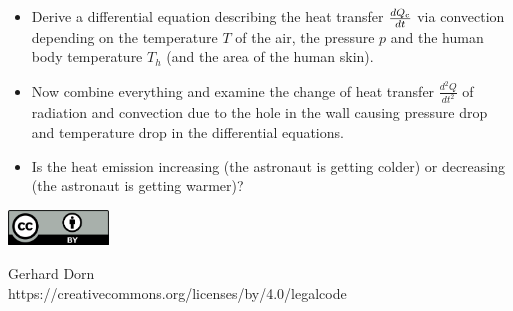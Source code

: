 \documentclass[12pt,a4paper]{article} %
\begin{document}
\begin{itemize}
\item Derive a differential equation describing the heat transfer $\frac{dQ_\textnormal{c}}{dt}$ via convection depending on the temperature $T$ of the air, the pressure $p$ and the human body temperature $T_h$ (and the area of the human skin).
 \item Now combine everything and examine the change of heat transfer $\frac{d^2 Q}{dt^2}$ of radiation and convection due to the hole in the wall causing pressure drop and temperature drop in the differential equations. 
\item Is the heat emission increasing (the astronaut is getting colder) or decreasing (the astronaut is getting warmer)?
\end{itemize}







\vspace{2cm}
\begin{minipage}[t]{1\textwidth}
	\raggedleft
	\centering
	\includegraphics[width = 0.20\textwidth]{CC-BY_icon}
	\vspace{0.2cm}
	
	\centering
	{\Large Gerhard Dorn} \\
	https://creativecommons.org/licenses/by/4.0/legalcode
\end{minipage}



  
\end{document}
